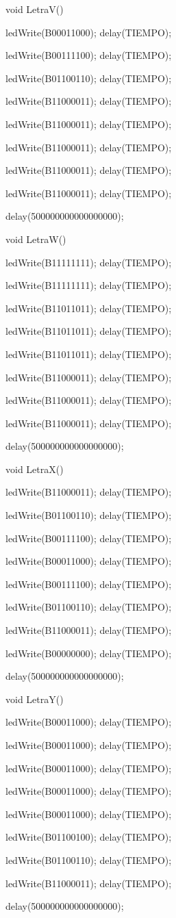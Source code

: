 \documentclass{article}
\begin{document}
void LetraV(){

   ledWrite(B00011000); delay(TIEMPO);

   ledWrite(B00111100); delay(TIEMPO);

   ledWrite(B01100110); delay(TIEMPO);

   ledWrite(B11000011); delay(TIEMPO);

   ledWrite(B11000011); delay(TIEMPO);

   ledWrite(B11000011); delay(TIEMPO);

   ledWrite(B11000011); delay(TIEMPO);

   ledWrite(B11000011); delay(TIEMPO);

  delay(500000000000000000);}

void LetraW(){

   ledWrite(B11111111); delay(TIEMPO);

   ledWrite(B11111111); delay(TIEMPO);

   ledWrite(B11011011); delay(TIEMPO);

   ledWrite(B11011011); delay(TIEMPO);

   ledWrite(B11011011); delay(TIEMPO);

   ledWrite(B11000011); delay(TIEMPO);

   ledWrite(B11000011); delay(TIEMPO);

   ledWrite(B11000011); delay(TIEMPO);

  delay(500000000000000000);}

void LetraX(){

   ledWrite(B11000011); delay(TIEMPO);

   ledWrite(B01100110); delay(TIEMPO);

   ledWrite(B00111100); delay(TIEMPO);

   ledWrite(B00011000); delay(TIEMPO);


   ledWrite(B00111100); delay(TIEMPO);

   ledWrite(B01100110); delay(TIEMPO);

   ledWrite(B11000011); delay(TIEMPO);

   ledWrite(B00000000); delay(TIEMPO);

  delay(500000000000000000);}

void LetraY(){

   ledWrite(B00011000); delay(TIEMPO);

   ledWrite(B00011000); delay(TIEMPO);

   ledWrite(B00011000); delay(TIEMPO);

   ledWrite(B00011000); delay(TIEMPO);

   ledWrite(B00011000); delay(TIEMPO);

   ledWrite(B01100100); delay(TIEMPO);

   ledWrite(B01100110); delay(TIEMPO);

   ledWrite(B11000011); delay(TIEMPO);

  delay(500000000000000000);}
\end{document}
